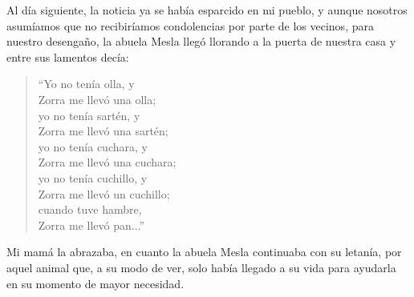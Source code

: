 Al día siguiente, la noticia ya se había esparcido en mi pueblo, y aunque nosotros asumíamos que no recibiríamos condolencias por parte de los vecinos, para nuestro desengaño, la abuela Mesla llegó llorando a la puerta de nuestra casa y entre sus lamentos decía:
\begin{quotation}
\noindent ``Yo no tenía olla, y \\Zorra me llevó una olla;\\ 
yo no tenía sartén, y \\Zorra me llevó una sartén;\\ 
yo no tenía cuchara, y \\Zorra me llevó una cuchara;\\
yo no tenía cuchillo, y \\Zorra me llevó un cuchillo;\\
cuando tuve hambre, \\Zorra me llevó pan...''
\end{quotation}
Mi mamá la abrazaba, en cuanto la abuela Mesla continuaba con su letanía, por aquel animal que, a su modo de ver, solo había llegado a su vida para ayudarla en su momento de mayor necesidad.

